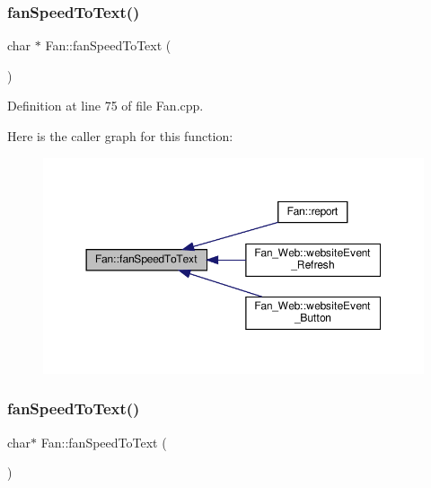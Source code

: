 \subsubsection{\texorpdfstring{fan\+Speed\+To\+Text()}{fanSpeedToText()}\hspace{0.1cm}{\footnotesize\ttfamily [1/2]}}
{\footnotesize\ttfamily char $\ast$ Fan\+::fan\+Speed\+To\+Text (\begin{DoxyParamCaption}{ }\end{DoxyParamCaption})}



Definition at line 75 of file Fan.\+cpp.

Here is the caller graph for this function\+:
\nopagebreak
\begin{figure}[H]
\begin{center}
\leavevmode
\includegraphics[width=350pt]{class_fan_a492f2551cf8f05d4ce64911807269764_icgraph}
\end{center}
\end{figure}
\mbox{\label{class_fan_ad1733d51556ca00cce7e9f2ed129de5f}} 
\subsubsection{\texorpdfstring{fan\+Speed\+To\+Text()}{fanSpeedToText()}\hspace{0.1cm}{\footnotesize\ttfamily [2/2]}}
{\footnotesize\ttfamily char$\ast$ Fan\+::fan\+Speed\+To\+Text (\begin{DoxyParamCaption}{ }\end{DoxyParamCaption})}

\mbox{\label{class_fan_ad4605196f9611585e9416bcce3d84723}} 
